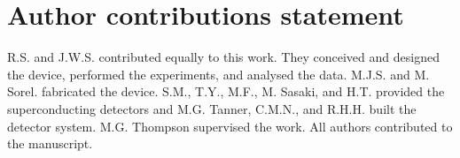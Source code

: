 \documentclass[
twocolumn,
 amsmath,amssymb,
 aps,
  twoside,
 superscriptaddress,
pra,
longbibliography
]{revtex4-1}
\begin{document}
\section*{Author contributions statement}

R.S. and J.W.S. contributed equally to this work. They conceived and designed the device, performed the experiments, and analysed the data. M.J.S. and M. Sorel. fabricated the device. S.M., T.Y., M.F., M. Sasaki, and H.T. provided the superconducting detectors and M.G. Tanner, C.M.N., and R.H.H. built the detector system. M.G. Thompson supervised the work. All authors contributed to the manuscript.




\end{document}
